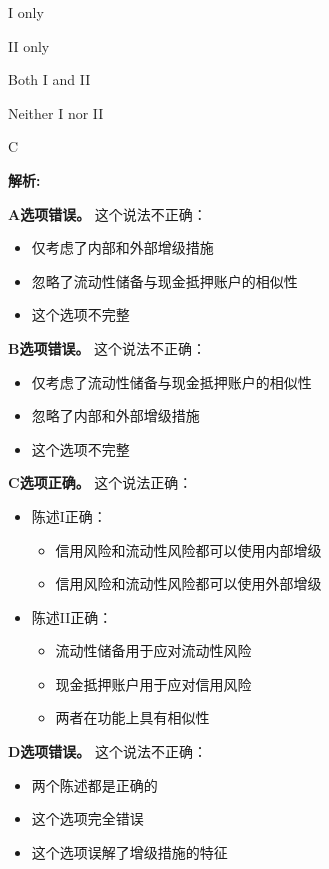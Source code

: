 \documentclass{article}
\newenvironment{explanation}
{\textbf{解析:}\par}
{\par}
\begin{document}
\begin{choices}
    \item I only
    \item II only
    \item Both I and II
    \item Neither I nor II
\end{choices}

\begin{correctanswer}
    C
\end{correctanswer}

\begin{explanation}
    \textbf{A选项错误。}
    这个说法不正确：
    \begin{itemize}
        \item 仅考虑了内部和外部增级措施
        \item 忽略了流动性储备与现金抵押账户的相似性
        \item 这个选项不完整
    \end{itemize}

    \textbf{B选项错误。}
    这个说法不正确：
    \begin{itemize}
        \item 仅考虑了流动性储备与现金抵押账户的相似性
        \item 忽略了内部和外部增级措施
        \item 这个选项不完整
    \end{itemize}

    \textbf{C选项正确。}
    这个说法正确：
    \begin{itemize}
        \item 陈述I正确：
        \begin{itemize}
            \item 信用风险和流动性风险都可以使用内部增级
            \item 信用风险和流动性风险都可以使用外部增级
        \end{itemize}
        \item 陈述II正确：
        \begin{itemize}
            \item 流动性储备用于应对流动性风险
            \item 现金抵押账户用于应对信用风险
            \item 两者在功能上具有相似性
        \end{itemize}
    \end{itemize}

    \textbf{D选项错误。}
    这个说法不正确：
    \begin{itemize}
        \item 两个陈述都是正确的
        \item 这个选项完全错误
        \item 这个选项误解了增级措施的特征
    \end{itemize}
\end{explanation}
\end{document}
